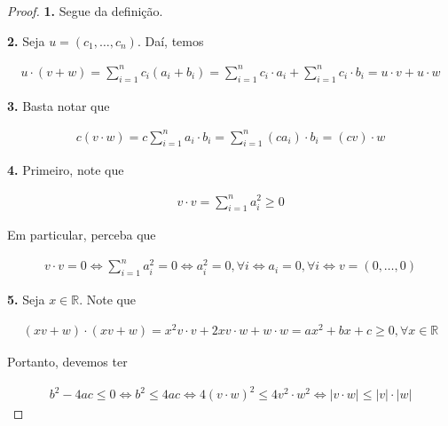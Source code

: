 \documentclass{article}
\begin{document}
\begin{proof}
	\textbf{1.} Segue da definição.
	\par\vspace{0.4cm}\hspace{16pt}\textbf{2.} Seja $u = (c_1, \dots, c_n)$. Daí, temos
	
	\begin{align*}
	u\cdot (v + w) = \sum_{i=1}^{n}c_i(a_i + b_i) = \sum_{i=1}^{n}c_i\cdot a_i + \sum_{i=1}^{n}c_i\cdot b_i = u\cdot v + u\cdot w
	\end{align*}
	
	\par\vspace{0.4cm}\hspace{16pt}\textbf{3.} Basta notar que
	
	\begin{align*}
	c(v\cdot w) = c\sum_{i=1}^{n}a_i\cdot b_i = \sum_{i=1}^{n}(ca_i)\cdot b_i = (cv)\cdot w
	\end{align*}
	
	\par\vspace{0.4cm}\hspace{16pt}\textbf{4.} Primeiro, note que
	
	\begin{align*}
	v\cdot v = \sum_{i=1}^{n}a_i^2 \geq 0
	\end{align*}
	
	\par\vspace{0.3cm} Em particular, perceba que
	
	\begin{align*}
	v\cdot v = 0 \Leftrightarrow  \sum_{i=1}^{n}a_i^2 = 0 \Leftrightarrow a_i^2 = 0, \forall i \Leftrightarrow a_i = 0, \forall i \Leftrightarrow v = (0, \dots, 0)
	\end{align*}
	
	\par\vspace{0.4cm}\hspace{16pt}\textbf{5.} Seja $x\in\mathbb{R}$. Note que
	
	\begin{align*}
	(xv + w)\cdot(xv + w) = x^2v\cdot v + 2xv\cdot w + w\cdot w = ax^2 + bx + c \geq 0, \forall x\in\mathbb{R}
	\end{align*}
	
	\par\vspace{0.3cm} Portanto, devemos ter
	
	\begin{align*}
	b^2 - 4ac \leq 0 \Leftrightarrow b^2 \leq 4ac \Leftrightarrow 4(v\cdot w)^2 \leq 4v^2\cdot w^2 \Leftrightarrow |v\cdot w| \leq |v|\cdot|w|
	\end{align*}
	
\end{proof}
\end{document}
